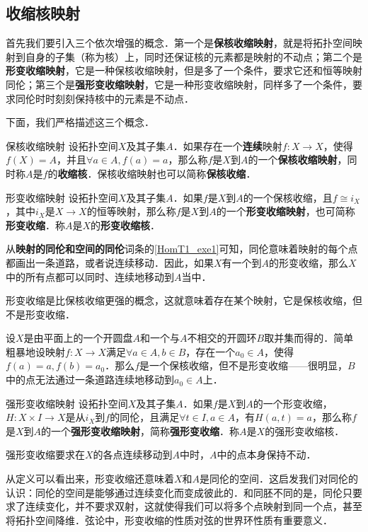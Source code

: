 \subsection{收缩核映射}

首先我们要引入三个依次增强的概念．第一个是\textbf{保核收缩映射}，就是将拓扑空间映射到自身的子集（称为核）上，同时还保证核的元素都是映射的不动点；第二个是\textbf{形变收缩映射}，它是一种保核收缩映射，但是多了一个条件，要求它还和恒等映射同伦；第三个是\textbf{强形变收缩映射}，它是一种形变收缩映射，同样多了一个条件，要求同伦时时刻刻保持核中的元素是不动点．

下面，我们严格描述这三个概念．

\begin{definition}{保核收缩映射}
设拓扑空间$X$及其子集$A$．如果存在一个\textbf{连续}映射$f:X\rightarrow X$，使得$f(X)=A$，并且$\forall a\in A, f(a)=a$，那么称$f$是$X$到$A$的一个\textbf{保核收缩映射}，同时称$A$是$f$的\textbf{收缩核}．保核收缩映射也可以简称\textbf{保核收缩}．
\end{definition}

\begin{definition}{形变收缩映射}
设拓扑空间$X$及其子集$A$．如果$f$是$X$到$A$的一个保核收缩，且$f\cong i_X$，其中$i_X$是$X\rightarrow X$的恒等映射，那么称$f$是$X$到$A$的一个\textbf{形变收缩映射}，也可简称\textbf{形变收缩}．称$A$是$X$的\textbf{形变收缩核}．
\end{definition}

从\textbf{映射的同伦和空间的同伦}词条的\autoref{HomT1_exe1}可知，同伦意味着映射的每个点都画出一条道路，或者说连续移动．因此，如果$X$有一个到$A$的形变收缩，那么$X$中的所有点都可以同时、连续地移动到$A$当中．

形变收缩是比保核收缩更强的概念，这就意味着存在某个映射，它是保核收缩，但不是形变收缩．

\begin{example}{}
设$X$是由平面上的一个开圆盘$A$和一个与$A$不相交的开圆环$B$取并集而得的．简单粗暴地设映射$f:X\rightarrow X$满足$\forall a\in A, b\in B$，存在一个$a_0\in A$，使得$f(a)=a, f(b)=a_0$．那么$f$是一个保核收缩，但不是形变收缩——很明显，$B$中的点无法通过一条道路连续地移动到$a_0\in A$上．
\end{example}

\begin{definition}{强形变收缩映射}
设拓扑空间$X$及其子集$A$．如果$f$是$X$到$A$的一个形变收缩，$H:X\times I\rightarrow X$是从$i_X$到$f$的同伦，且满足$\forall t\in I, a\in A$，有$H(a, t)=a$，那么称$f$是$X$到$A$的一个\textbf{强形变收缩映射}，简称\textbf{强形变收缩}．称$A$是$X$的强形变收缩核．
\end{definition}

强形变收缩要求在$X$的各点连续移动到$A$中时，$A$中的点本身保持不动．

从定义可以看出来，形变收缩还意味着$X$和$A$是同伦的空间．这启发我们对同伦的认识：同伦的空间是能够通过连续变化而变成彼此的．和同胚不同的是，同伦只要求了连续变化，并不要求双射，这就使得我们可以将多个点映射到同一个点，甚至将拓扑空间降维．弦论中，形变收缩的性质对弦的世界环性质有重要意义．



